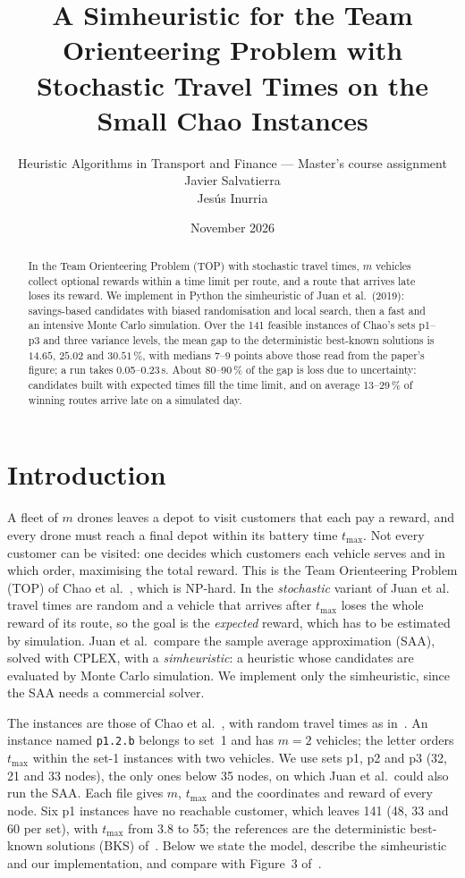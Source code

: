 \documentclass[10pt,a4paper]{article}
\title{\vspace{-1.2cm}\bfseries A Simheuristic for the Team Orienteering Problem with\\
Stochastic Travel Times on the Small Chao Instances}
\author{Heuristic Algorithms in Transport and Finance --- Master's course assignment \\
    Javier Salvatierra \\
    Jesús Inurria
}
\date{November 2026}
\begin{document}
\maketitle
\vspace{-0.8cm}

\begin{abstract}
\noindent\small
In the Team Orienteering Problem (TOP) with stochastic travel times, $m$ vehicles collect optional
rewards within a time limit per route, and a route that arrives late loses its reward. We implement in
Python the simheuristic of Juan et al.\ (2019): savings-based candidates with biased randomisation and
local search, then a fast and an intensive Monte Carlo simulation. Over the 141 feasible instances of
Chao's sets p1--p3 and three variance levels, the mean gap to the deterministic best-known solutions is
$14.65$, $25.02$ and $30.51\,\%$, with medians 7--9 points above those read from the paper's figure; a
run takes 0.05--0.23\,s. About 80--90\,\% of the gap is loss due to uncertainty: candidates built with
expected times fill the time limit, and on average 13--29\,\% of winning routes arrive late on a
simulated day.
\end{abstract}

\section{Introduction}

A fleet of $m$ drones leaves a depot to visit customers that each pay a reward, and every drone must
reach a final depot within its battery time $t_{\max}$. Not every customer can be visited: one decides
which customers each vehicle serves and in which order, maximising the total reward. This is the Team
Orienteering Problem (TOP) of Chao et al.~\cite{chao1996}, which is NP-hard. In the \emph{stochastic}
variant of Juan et al.~\cite{juan2019} travel times are random and a vehicle that arrives after
$t_{\max}$ loses the whole reward of its route, so the goal is the \emph{expected} reward, which has to be
estimated by simulation. Juan et al.\ compare the sample average approximation (SAA), solved with CPLEX,
with a \emph{simheuristic}: a heuristic whose candidates are evaluated by Monte Carlo simulation. We
implement only the simheuristic, since the SAA needs a commercial solver.

The instances are those of Chao et al.~\cite{chao1996}, with random travel times as in~\cite{juan2019}.
An instance named \texttt{p1.2.b} belongs to set~1 and has $m=2$ vehicles; the letter orders $t_{\max}$ within the set-1 instances with two vehicles. We
use sets p1, p2 and p3 (32, 21 and 33 nodes), the only ones below 35 nodes, on which Juan et al.\ could
also run the SAA. Each file gives $m$, $t_{\max}$ and the coordinates and reward of every node. Six p1
instances have no reachable customer, which leaves 141 (48, 33 and 60 per set), with $t_{\max}$ from
3.8 to 55; the references are the deterministic best-known solutions (BKS) of~\cite{dang2013}. Below we
state the model, describe the simheuristic and our implementation, and compare with Figure~3
of~\cite{juan2019}.
\end{document}
